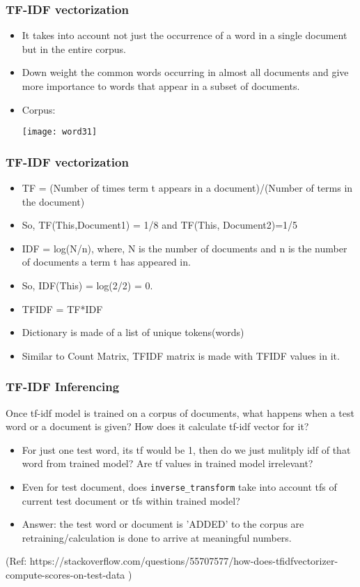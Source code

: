\begin{frame}[fragile]\frametitle{TF-IDF vectorization}
\begin{itemize}
\item It takes into account not just the occurrence of a word in a single document but in the entire corpus.
\item Down weight the common words occurring in almost all documents and give more importance to words that appear in a subset of documents.
\item Corpus:
\begin{center}
\texttt{[image: word31]}
\end{center}
\end{itemize}
\end{frame}

\begin{frame}[fragile]\frametitle{TF-IDF vectorization}
\begin{itemize}
\item TF = (Number of times term t appears in a document)/(Number of terms in the document)
\item So, TF(This,Document1) = 1/8  and TF(This, Document2)=1/5
\item IDF = log(N/n), where, N is the number of documents and n is the number of documents a term t has appeared in.
\item So, IDF(This) = log(2/2) = 0.
\item TFIDF = TF*IDF
\item Dictionary is made of a list of unique tokens(words) 
\item Similar to Count Matrix, TFIDF matrix is made with TFIDF values in it.
\end{itemize}
\end{frame}

\begin{frame}[fragile]\frametitle{TF-IDF Inferencing}
Once tf-idf model is trained on a corpus of documents, what happens when a test word or a document is given? How does it calculate tf-idf vector for it?
\begin{itemize}
\item For just one test word, its tf would be 1, then do we just mulitply idf of that word from trained model? Are tf values in trained model irrelevant?
\item Even for test document, does \lstinline|inverse_transform| take into account tfs of current test document or tfs within trained model?
\item Answer: the test word or document is 'ADDED' to the corpus are retraining/calculation is done to arrive at meaningful numbers.
\end{itemize}

{\tiny (Ref: https://stackoverflow.com/questions/55707577/how-does-tfidfvectorizer-compute-scores-on-test-data )}
\end{frame}

